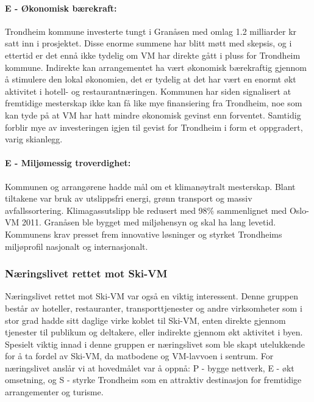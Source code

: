 \paragraph{E - Økonomisk bærekraft:} Trondheim kommune investerte tungt i Granåsen med omlag 1.2 
milliarder kr satt inn i prosjektet\parencite{NRK12Milliarder}. Disse enorme summene har blitt møtt med skepsis,
og i ettertid er det ennå ikke tydelig om VM har direkte gått i pluss for Trondheim kommune\parencite{AftenpostenNyVM}.
Indirekte kan arrangementet ha vært økonomisk bærekraftig gjennom å stimulere den lokal
økonomien, det er tydelig at det har vært en enormt økt aktivitet i hotell- og
restaurantnæringen\parencite{DagbladetPriser}. Kommunen har siden signalisert at fremtidige mesterskap ikke
kan få like mye finansiering fra Trondheim\parencite{NeaRadioVM}, noe som kan tyde på at VM har hatt mindre økonomisk
gevinst enn forventet. Samtidig forblir mye av investeringen igjen til gevist for Trondheim i form
et oppgradert, varig skianlegg.

\paragraph{E - Miljømessig troverdighet:} Kommunen og arrangørene hadde mål om et klimanøytralt 
mesterskap\parencite{TrondheimKommuneVM}. Blant tiltakene var bruk av utslippsfri energi, grønn 
transport og massiv avfallssortering. Klimagassutslipp ble redusert med 98\% sammenlignet 
med Oslo-VM 2011\parencite{Trondheim2025Kutt}. Granåsen ble bygget med miljøhensyn og skal ha lang levetid. 
Kommunens krav presset frem innovative løsninger og styrket Trondheims miljøprofil nasjonalt og internasjonalt.

\subsubsection{Næringslivet rettet mot Ski-VM}
Næringslivet rettet mot Ski-VM var også en viktig interessent. Denne gruppen består av 
hoteller, restauranter, transporttjenester og andre virksomheter som i stor grad hadde sitt 
daglige virke koblet til Ski-VM, enten direkte gjennom tjenester til publikum og deltakere, 
eller indirekte gjennom økt aktivitet i byen. Spesielt viktig innad i denne gruppen er 
næringslivet som ble skapt utelukkende for å ta fordel av Ski-VM, da matbodene og VM-lavvoen 
i sentrum. For næringslivet anslår vi at hovedmålet var å oppnå: P - bygge nettverk, E - økt omsetning,  og S - styrke Trondheim som en attraktiv destinasjon for fremtidige arrangementer og turisme.

